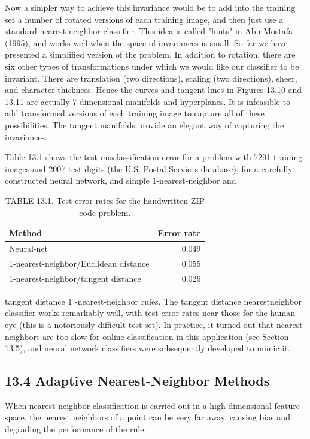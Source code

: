 \documentclass[10pt]{article}
\begin{document}
Now a simpler way to achieve this invariance would be to add into the training set a number of rotated versions of each training image, and then just use a standard nearest-neighbor classifier. This idea is called "hints" in Abu-Mostafa (1995), and works well when the space of invariances is small. So far we have presented a simplified version of the problem. In addition to rotation, there are six other types of transformations under which we would like our classifier to be invariant. There are translation (two directions), scaling (two directions), sheer, and character thickness. Hence the curves and tangent lines in Figures 13.10 and 13.11 are actually 7-dimensional manifolds and hyperplanes. It is infeasible to add transformed versions of each training image to capture all of these possibilities. The tangent manifolds provide an elegant way of capturing the invariances.

Table 13.1 shows the test misclassification error for a problem with 7291 training images and 2007 test digits (the U.S. Postal Services database), for a carefully constructed neural network, and simple 1-nearest-neighbor and

\begin{table}[h]
\begin{center}
\captionsetup{labelformat=empty}
\caption{TABLE 13.1. Test error rates for the handwritten ZIP code problem.}
\begin{tabular}{lr}
\hline
Method & Error rate \\
\hline
Neural-net & 0.049 \\
1-nearest-neighbor/Euclidean distance & 0.055 \\
1-nearest-neighbor/tangent distance & 0.026 \\
\hline
\end{tabular}
\end{center}
\end{table}

tangent distance 1 -nearest-neighbor rules. The tangent distance nearestneighbor classifier works remarkably well, with test error rates near those for the human eye (this is a notoriously difficult test set). In practice, it turned out that nearest-neighbors are too slow for online classification in this application (see Section 13.5), and neural network classifiers were subsequently developed to mimic it.

\subsection*{13.4 Adaptive Nearest-Neighbor Methods}
When nearest-neighbor classification is carried out in a high-dimensional feature space, the nearest neighbors of a point can be very far away, causing bias and degrading the performance of the rule.
\end{document}
